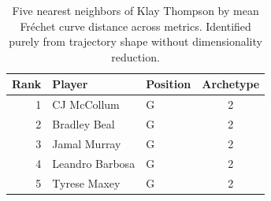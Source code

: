 \begin{table}[htbp]
  \centering\small
  \begin{tabular}{rllc}
    \toprule
    Rank & Player & Position & Archetype \\
    \midrule
    1 & CJ McCollum & G & 2 \\
    2 & Bradley Beal & G & 2 \\
    3 & Jamal Murray & G & 2 \\
    4 & Leandro Barbosa & G & 2 \\
    5 & Tyrese Maxey & G & 2 \\
    \bottomrule
  \end{tabular}
  \caption{Five nearest neighbors of Klay Thompson by mean Fr\'{e}chet curve distance across metrics. Identified purely from trajectory shape without dimensionality reduction.}
  \label{tab:Klay_Thompson_frechet_curve_neighbors}
\end{table}

